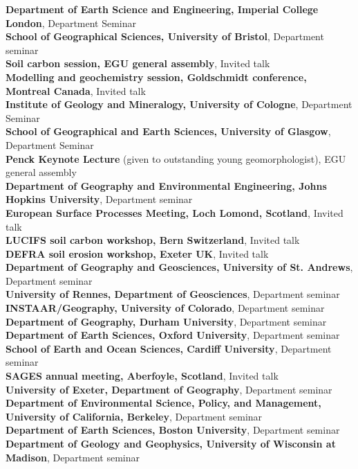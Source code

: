 \documentclass[10pt, a4paper]{article}
\newcommand{\years}[1]{\marginnote{\scriptsize #1}}
\begin{document}
\textbf{Department of Earth Science and Engineering, Imperial College London},  Department Seminar\\[0.05cm]
\textbf{School of Geographical Sciences, University of Bristol}, Department seminar\\[0.05cm]  
\years{2012}\textbf{Soil carbon session, EGU general assembly}, Invited talk\\[0.05cm]
\textbf{Modelling and geochemistry session, Goldschmidt conference, Montreal Canada}, Invited talk\\[0.05cm]
\textbf{Institute of Geology and Mineralogy, University of Cologne}, Department Seminar\\[0.05cm]
\textbf{School of Geographical and Earth Sciences, University of Glasgow}, Department Seminar\\[0.05cm]
\years{2011}\textbf{Penck Keynote Lecture} (given to outstanding young geomorphologist), EGU general assembly\\[0.05cm]
\textbf{Department of Geography and Environmental Engineering, Johns Hopkins University}, Department seminar\\[0.05cm]
\textbf{European Surface Processes Meeting, Loch Lomond, Scotland}, Invited talk\\[0.05cm]
\textbf{LUCIFS soil carbon workshop, Bern Switzerland}, Invited talk\\[0.05cm]
\textbf{DEFRA soil erosion workshop, Exeter UK}, Invited talk\\[0.05cm]
\years{2010}\textbf{Department of Geography and Geosciences, University of St. Andrews}, Department seminar\\[0.05cm]
\textbf{University of Rennes, Department of Geosciences}, Department seminar\\[0.05cm]
\years{2009}\textbf{INSTAAR/Geography, University of Colorado}, Department seminar\\[0.05cm]
\textbf{Department of Geography, Durham University}, Department seminar\\[0.05cm]
\textbf{Department of Earth Sciences, Oxford University}, Department seminar\\[0.05cm]
\textbf{School of Earth and Ocean Sciences, Cardiff University}, Department seminar\\[0.05cm]
\years{2008}\textbf{SAGES annual meeting, Aberfoyle, Scotland}, Invited talk\\[0.05cm]
\years{2007}\textbf{University of Exeter, Department of Geography}, Department seminar\\[0.05cm]
\years{2006}\textbf{Department of Environmental Science, Policy, and Management, University of California, Berkeley}, Department seminar\\[0.05cm]
\textbf{Department of Earth Sciences, Boston University}, Department seminar\\[0.05cm]
\textbf{Department of Geology and Geophysics, University of Wisconsin at Madison}, Department seminar\\[0.05cm]
\end{document}
